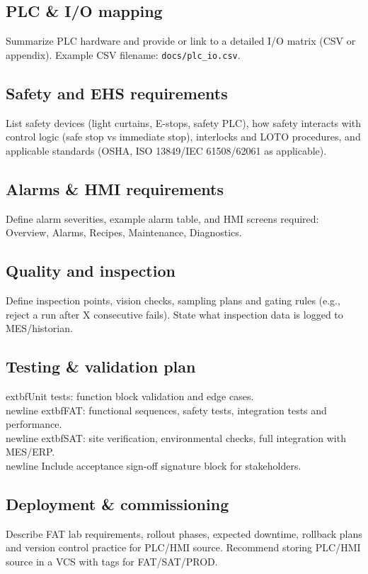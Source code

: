 \documentclass[a4paper,10pt]{article}
\begin{document}
\subsection*{PLC \& I/O mapping}
Summarize PLC hardware and provide or link to a detailed I/O matrix (CSV or appendix). Example CSV filename: \texttt{docs/plc\_io.csv}.

\subsection*{Safety and EHS requirements}
List safety devices (light curtains, E-stops, safety PLC), how safety interacts with control logic (safe stop vs immediate stop), interlocks and LOTO procedures, and applicable standards (OSHA, ISO 13849/IEC 61508/62061 as applicable).

\subsection*{Alarms \& HMI requirements}
Define alarm severities, example alarm table, and HMI screens required: Overview, Alarms, Recipes, Maintenance, Diagnostics.

\subsection*{Quality and inspection}
Define inspection points, vision checks, sampling plans and gating rules (e.g., reject a run after X consecutive fails). State what inspection data is logged to MES/historian.

\subsection*{Testing \& validation plan}
  extbf{Unit tests:} function block validation and edge cases.\\newline
  extbf{FAT:} functional sequences, safety tests, integration tests and performance.\\newline
  extbf{SAT:} site verification, environmental checks, full integration with MES/ERP.\\newline
Include acceptance sign-off signature block for stakeholders.

\subsection*{Deployment \& commissioning}
Describe FAT lab requirements, rollout phases, expected downtime, rollback plans and version control practice for PLC/HMI source. Recommend storing PLC/HMI source in a VCS with tags for FAT/SAT/PROD.
\end{document}
